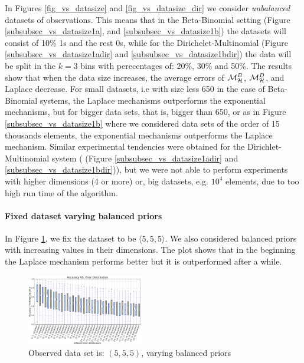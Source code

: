 \documentclass[sigconf]{acmart}
\begin{document}
In Figures \ref{fig_vs_datasize} and \ref{fig_vs_datasize_dir} we consider \emph{unbalanced} datasets
of observations. This means that in the Beta-Binomial setting (Figure \ref{subsubsec_vs_datasize1a},
and \ref{subsubsec_vs_datasize1b}) the datasets will consist of 10\% 1s and the rest 0s, while for the
Dirichelet-Multinomial (Figure  \ref{subsubsec_vs_datasize1adir} and \ref{subsubsec_vs_datasize1bdir})
the data will be split in the $k=3$ bins with perecentages of: 20\%, 30\% and 50\%.
The results show that when the data size
increases, the average errors of
$\mathcal{M}^{B}_{\mathcal{H}}$, $\mathcal{M}^{D}_{\mathcal{H}}$, and Laplace decrease. For small datasets,
i.e with size less 650 in the case of Beta-Binomial systems,
the Laplace mechanisms outperforms the exponential mechanisms,
but for bigger data sets, that is, bigger than 650, or as in Figure \ref{subsubsec_vs_datasize1b} where
we considered data sets of the order of 15 thousands elements,
the exponential mechanisms outperforms the Laplace mechanism.
Similar experimental tendencies were obtained for the Dirichlet-Multinomial system ( (Figure  \ref{subsubsec_vs_datasize1adir} and \ref{subsubsec_vs_datasize1bdir})),
but we were not able to perform experiments with higher dimensions (4 or more) or, big datasets, e.g. $10^4$ elements, due to
too high run time of the algorithm.




\paragraph{Fixed dataset varying balanced priors}
\label{subsubsec_vs_prior}
In Figure \ref{fig_vs_prior}, we fix the dataset to be $\langle 5,5,5\rangle$.
We also considered balanced priors with increasing values in their dimensions.
The plot shows that in the beginning the Laplace mechanism performs better but
it is outperformed after a while.
\begin{figure}[H]
\centering
\includegraphics[width=0.45\textwidth]{accuracy_vs_prior_5_5_5.eps}
\caption{Observed data set is: $(5,5,5)$, varying balanced priors}
\label{fig_vs_prior}
\end{figure}
\end{document}
